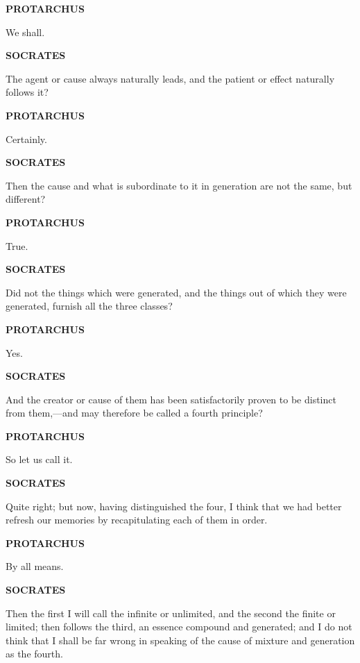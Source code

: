 \documentclass[11pt,letter]{article}
\begin{document}
\par \textbf{PROTARCHUS}
\par   We shall.

\par \textbf{SOCRATES}
\par   The agent or cause always naturally leads, and the patient or effect naturally follows it?

\par \textbf{PROTARCHUS}
\par   Certainly.

\par \textbf{SOCRATES}
\par   Then the cause and what is subordinate to it in generation are not the same, but different?

\par \textbf{PROTARCHUS}
\par   True.

\par \textbf{SOCRATES}
\par   Did not the things which were generated, and the things out of which they were generated, furnish all the three classes?

\par \textbf{PROTARCHUS}
\par   Yes.

\par \textbf{SOCRATES}
\par   And the creator or cause of them has been satisfactorily proven to be distinct from them,—and may therefore be called a fourth principle?

\par \textbf{PROTARCHUS}
\par   So let us call it.

\par \textbf{SOCRATES}
\par   Quite right; but now, having distinguished the four, I think that we had better refresh our memories by recapitulating each of them in order.

\par \textbf{PROTARCHUS}
\par   By all means.

\par \textbf{SOCRATES}
\par   Then the first I will call the infinite or unlimited, and the second the finite or limited; then follows the third, an essence compound and generated; and I do not think that I shall be far wrong in speaking of the cause of mixture and generation as the fourth.
\end{document}
